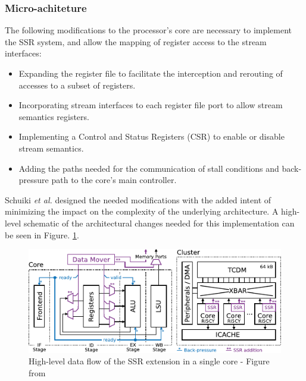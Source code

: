 \subsubsection{Micro-achiteture}

The following modifications to the processor's core are necessary to implement the SSR system, and allow the mapping of register access to the stream interfaces:

\begin{itemize}
\item[]  Expanding the register file to facilitate the interception and rerouting of accesses to a subset of registers.
\item[]  Incorporating stream interfaces to each register file port to allow stream semantics registers.
\item[]  Implementing a Control and Status Registers (CSR) to enable or disable stream semantics.
\item[]  Adding the paths needed for the communication of stall conditions and back-pressure path to the core's main controller.
\end{itemize}

Schuiki \textit{et al.} \cite{9068465} designed the needed modifications with the added intent of minimizing the impact on the complexity of the underlying architecture. A high-level schematic of the architectural changes needed for this implementation can be seen in Figure. \ref{fig:ssr-overview}.

\begin{figure}[H]
	\begin{center}
 		\includegraphics[width=0.87\linewidth]{images/ssr-overview.pdf}
 		\caption{High-level data flow of the SSR extension in a single core  - Figure from \cite{9068465}}
 		\label{fig:ssr-overview}
	\end{center} 
\end{figure}

